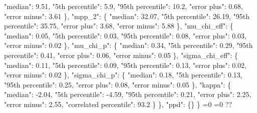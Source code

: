 {{          "median": 9.51, %
          "5th percentile": 5.9, %
          "95th percentile": 10.2, %
          "error plus": 0.68, %
          "error minus": 3.61%
        \}, %
        "mpp\_2": \{%
          "median": 32.07, %
          "5th percentile": 26.19, %
          "95th percentile": 35.75, %
          "error plus": 3.68, %
          "error minus": 5.88%
        \}, %
        "mu\_chi\_eff": \{%
          "median": 0.05, %
          "5th percentile": 0.03, %
          "95th percentile": 0.08, %
          "error plus": 0.03, %
          "error minus": 0.02%
        \}, %
        "mu\_chi\_p": \{%
          "median": 0.34, %
          "5th percentile": 0.29, %
          "95th percentile": 0.41, %
          "error plus": 0.06, %
          "error minus": 0.05%
        \}, %
        "sigma\_chi\_eff": \{%
          "median": 0.11, %
          "5th percentile": 0.09, %
          "95th percentile": 0.13, %
          "error plus": 0.02, %
          "error minus": 0.02%
        \}, %
        "sigma\_chi\_p": \{%
          "median": 0.18, %
          "5th percentile": 0.13, %
          "95th percentile": 0.25, %
          "error plus": 0.08, %
          "error minus": 0.05%
        \}, %
        "kappa": \{%
          "median": {-}2.04, %
          "5th percentile": {-}4.59, %
          "95th percentile": 0.21, %
          "error plus": 2.25, %
          "error minus": 2.55, %
          "correlated percentile": 93.2%
        \}%
      \}, %
      "ppd": \{\}%
    \}}%
  \else%
    \ifnum{}=0%
      \let\qchieffCopulaCorrelationModel@out\qchieffCopulaCorrelationModel@I%
    \else%
      \ifnum{}=0%
      \let\qchieffCopulaCorrelationModel@out\qchieffCopulaCorrelationModel@II%
    \else%
      \def\qchieffCopulaCorrelationModel@out{%
    ??}%
    \fi\fi
  \fi
  \qchieffCopulaCorrelationModel@out
}\newcommand\qchieffCopulaCorrelationModel@I[1][all]{%
  \ifnum\pdfstrcmp{#1}{all}=0%
    \def\qchieffCopulaCorrelationModel@I@out{%
    \{%
      "alpha\_1": \{%
        "median": 1.93, %
        "5th percentile": {-}0.24, %
        "95th percentile": 3.35, %
        "error plus": 1.42, %
        "error minus": 2.17%
      \}, %
      "alpha\_2": \{%
        "median": 4.56, %
        "5th percentile": 3.21, %
        "95th percentile": 6.08, %
        "error plus": 1.52, %
        "error minus": 1.35%
      \}, %
      "beta": \{%
        "median": 1.03, %
        "5th percentile": 0.1, %
        "95th percentile": 2.22, %
        "error plus": 1.19, %
        "error minus": 0.93%
      \}, %
      "break\_mass": \{%
        "median": 35.16, %
}}

